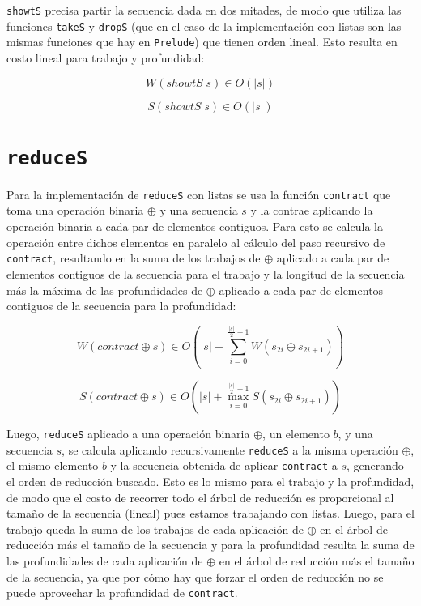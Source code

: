 \documentclass[a4paper,10pt]{article}
\begin{document}
\texttt{showtS} precisa partir la secuencia dada en dos mitades, de modo que
utiliza las funciones \texttt{takeS} y \texttt{dropS} (que en el caso de la
implementación con listas son las mismas funciones que hay en \texttt{Prelude})
que tienen orden lineal. Esto resulta en costo lineal para trabajo y profundidad:

\begin{equation*}
    W \left( showtS \; s \right) \in
    O \left( \vert s \vert \right)
\end{equation*}

\begin{equation*}
    S \left( showtS \; s \right) \in
    O \left( \vert s \vert \right)
\end{equation*}


\section*{\texttt{reduceS}}

Para la implementación de \texttt{reduceS} con listas se usa la función \texttt{contract}
que toma una operación binaria $\oplus$ y una secuencia $s$ y la contrae aplicando
la operación binaria a cada par de elementos contiguos. Para esto se calcula la
operación entre dichos elementos en paralelo al cálculo del paso recursivo de
\texttt{contract}, resultando en la suma de los trabajos de $\oplus$ aplicado a
cada par de elementos contiguos de la secuencia para el trabajo y la longitud de
la secuencia más la máxima de las profundidades de $\oplus$ aplicado a cada par de
elementos contiguos de la secuencia para la profundidad:

\begin{equation*}
    W \left( contract \oplus s \right) \in
    O \left( \vert s \vert + \sum_{i=0}^{\frac{\vert s \vert}{2} + 1} W \left( s_{2i} \oplus s_{2i+1} \right) \right)
\end{equation*}

\begin{equation*}
    S \left( contract \oplus s \right) \in
    O \left( \vert s \vert + \max_{i=0}^{\frac{\vert s \vert}{2} + 1} S \left( s_{2i} \oplus s_{2i+1} \right) \right)
\end{equation*}

Luego, \texttt{reduceS} aplicado a una operación binaria $\oplus$, un elemento $b$,
y una secuencia $s$, se calcula aplicando recursivamente \texttt{reduceS} a la
misma operación $\oplus$, el mismo elemento $b$ y la secuencia obtenida de aplicar
\texttt{contract} a $s$, generando el orden de reducción buscado. Esto es lo mismo
para el trabajo y la profundidad, de modo que el costo de recorrer todo el árbol
de reducción es proporcional al tamaño de la secuencia (lineal) pues estamos
trabajando con listas. Luego, para el trabajo queda la suma de los trabajos de
cada aplicación de $\oplus$ en el árbol de reducción más el tamaño de la secuencia y
para la profundidad resulta la suma de las profundidades de cada aplicación de
$\oplus$ en el árbol de reducción más el tamaño de la secuencia, ya que por cómo hay
que forzar el orden de reducción no se puede aprovechar la profundidad de \texttt{contract}.
\end{document}
